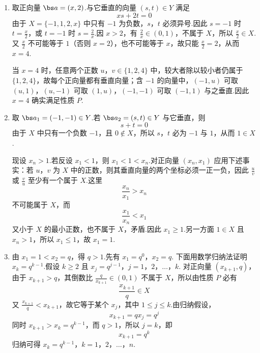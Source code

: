 \begin{solution}
\begin{enumerate}
\item 取正向量 \(\bs a=(x,2)\).与它垂直的向量 \((s,t)\in Y\) 满足
\[
xs+2t=0
\]
由于 \(X=\{-1,1,2,x\}\) 中只有 \(-1\) 为负数，\(s\)，\(t\) 必须异号.因此 \(s=-1\) 时 \(t=\frac{x}{2}\)，或 \(t=-1\) 时 \(s=\frac{2}{x}\).因 \(x>2\)，有 \(\frac{2}{x}\in(0,1)\)，不属于 \(X\)，所以 \(\frac{x}{2}\in X\).又 \(\frac{x}{2}\) 不可能等于 \(1\)（否则 \(x=2\)），也不可能等于 \(x\)，故只能 \(\frac{x}{2}=2\)，从而 \(x=4\).

当 \(x=4\) 时，任意两个正数 \(u\)，\(v\in\{1,2,4\}\) 中，较大者除以较小者仍属于 \(\{1,2,4\}\)，故每个正向量都有垂直向量；含 \(-1\) 的向量中，\((-1,u)\) 可取 \((u,1)\)，\((u,-1)\) 可取 \((1,u)\)，\((-1,-1)\) 可取 \((-1,1)\) 与之垂直.因此 \(x=4\) 确实满足性质 \(P\).

\item 取 \(\bs a_1=(-1,-1)\in Y\).若 \(\bs a_2=(s,t)\in Y\) 与它垂直，则
\[
s+t=0
\]
由于 \(X\) 中只有一个负数 \(-1\)，且 \(0\notin X\)，所以 \(s\)，\(t\) 必为 \(-1\) 与 \(1\)，从而 \(1\in X\).

现设 \(x_n>1\).若反设 \(x_1<1\)，则 \(x_1<1<x_n\).对正向量 \((x_n,x_1)\) 应用下述事实：若 \(u\)，\(v\) 为 \(X\) 中的正数，则其垂直向量的两个坐标必须一正一负，因此 \(\frac{u}{v}\) 或 \(\frac{v}{u}\) 至少有一个属于 \(X\).这里
\[
\frac{x_n}{x_1}>x_n
\]
不可能属于 \(X\)，而
\[
\frac{x_1}{x_n}<x_1
\]
又小于 \(X\) 的最小正数，也不属于 \(X\)，矛盾.因此 \(x_1\geqslant1\).另一方面 \(1\in X\) 且 \(x_n>1\)，所以 \(x_1\leqslant1\)，故 \(x_1=1\).

\item 由 \(x_1=1<x_2=q\)，得 \(q>1\).先有 \(x_1=q^0\)，\(x_2=q\).
下面用数学归纳法证明 \(x_k=q^{k-1}\).假设 \(k\geqslant2\) 且
\(x_j=q^{j-1}\)，\(j=1\)，\(2\)，\(\ldots\)，\(k\).
对正向量 \((x_{k+1},q)\)，由于 \(x_{k+1}>q\)，其倒数比 \(\frac{q}{x_{k+1}}\in(0,1)\) 不属于 \(X\)，所以由性质 \(P\) 必有
\[
\frac{x_{k+1}}q\in X
\]
又 \(\frac{x_{k+1}}{q}<x_{k+1}\)，故它等于某个 \(x_j\)，其中 \(1\leqslant j\leqslant k\).由归纳假设，
\[
x_{k+1}=q x_j=q^j
\]
同时 \(x_{k+1}>x_k=q^{k-1}\)，而 \(q>1\)，所以 \(j=k\)，即
\[
x_{k+1}=q^k
\]
归纳可得
\(x_k=q^{k-1}\)，\(k=1\)，\(2\)，\(\ldots\)，\(n\).
\end{enumerate}
\end{solution}
